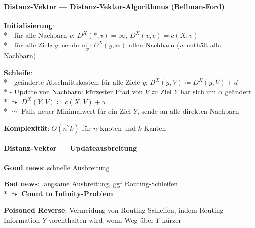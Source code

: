 \paragraph{Distanz-Vektor --- Distanz-Vektor-Algorithmus (Bellman-Ford)}
\begin{items}
  \item \textbf{Initialisierung}: \\*
    - für alle Nachbarn \( v \): \( D^X(*,v) = \infty \), \( D^X(v,v) = c(X,v) \) \\*
    - für alle Ziele \( y \): sende \( \underset{w}{\text{min}}D^X(y,w) \) allen Nachbarn (\( w \) enthält alle Nachbarn)
  \item \textbf{Schleife}: \\*
    - geänderte Abschnittskosten: für alle Ziele \( y \): \( D^X(y,V) \coloneqq D^X(y,V) + d \) \\*
    - Update von Nachbarn: kürzester Pfad von \( V \) zu Ziel \( Y \) hat sich um \( \alpha \) geändert \\*
    \phantom{-} \( \leadsto \) \( D^X(Y,V) \coloneqq c(X,V) + \alpha \) \\*
    \phantom{-} \( \leadsto \) Falls neuer Minimalwert für ein Ziel \( Y \),  sende an alle direkten Nachbarn
  \item \textbf{Komplexität}: \( O(n^2k) \) für \( n \) Knoten und \( k \) Kanten
\end{items}

\paragraph{Distanz-Vektor --- Updateausbreitung}
\begin{items}
  \item \textbf{Good news}: schnelle Ausbreitung
  \item \textbf{Bad news}: langsame Ausbreitung, ggf Routing-Schleifen \\*
    \( \leadsto \) \textbf{Count to Infinity-Problem}
  \item \textbf{Poisoned Reverse}: Vermeidung von Routing-Schleifen, indem Routing-Information \( Y \) vorenthalten wird, wenn Weg über \( Y \) kürzer
\end{items}

